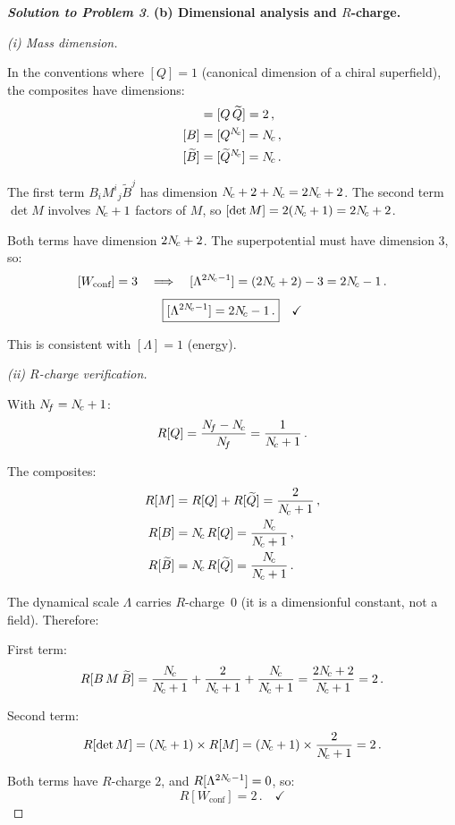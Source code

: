 \documentclass[11pt,a4paper]{article}
\begin{document}
\begin{proof}[\textbf{Solution to Problem 3}]
\bigskip

\textbf{(b) Dimensional analysis and $R$-charge.}

\textit{(i) Mass dimension.}

In the conventions where $[Q] = 1$ (canonical dimension of a chiral
superfield), the composites have dimensions:
\begin{align*}
  [M^i{}_j] &= [Q\,\widetilde{Q}] = 2\,, \\
  [B] &= [Q^{\Nc}] = \Nc\,, \\
  [\widetilde{B}] &= [\widetilde{Q}^{\Nc}] = \Nc\,.
\end{align*}

The first term $B_i M^i{}_j \widetilde{B}^j$ has dimension
$N_{\!c} + 2 + N_{\!c} = 2N_{\!c} + 2$.  The second term $\det M$ involves
$N_{\!c} + 1$ factors of $M$, so $[\det M] = 2(N_{\!c} + 1) = 2N_{\!c} + 2$.

Both terms have dimension $2N_{\!c} + 2$.  The superpotential must have
dimension $3$, so:
\[
  [W_{\text{conf}}] = 3
  \quad\Longrightarrow\quad
  [\Lambda^{2N_{\!c} - 1}] = (2N_{\!c} + 2) - 3 = 2N_{\!c} - 1\,.
\]
\[
  \boxed{[\Lambda^{2N_{\!c} - 1}] = 2N_{\!c} - 1\,.}
  \quad\checkmark
\]

This is consistent with $[\Lambda] = 1$ (energy).

\textit{(ii) $R$-charge verification.}

With $N_{\!f} = N_{\!c} + 1$:
\[
  R[Q] = \frac{N_{\!f} - N_{\!c}}{N_{\!f}} = \frac{1}{N_{\!c} + 1}\,.
\]

The composites:
\begin{align*}
  R[M] &= R[Q] + R[\widetilde{Q}] = \frac{2}{N_{\!c} + 1}\,, \\
  R[B] &= N_{\!c}\,R[Q] = \frac{N_{\!c}}{N_{\!c} + 1}\,, \\
  R[\widetilde{B}] &= N_{\!c}\,R[\widetilde{Q}] = \frac{N_{\!c}}{N_{\!c} + 1}\,.
\end{align*}

The dynamical scale $\Lambda$ carries $R$-charge~$0$ (it is a
dimensionful constant, not a field).  Therefore:

First term:
\[
  R[B\,M\,\widetilde{B}]
  = \frac{N_{\!c}}{N_{\!c}+1} + \frac{2}{N_{\!c}+1} + \frac{N_{\!c}}{N_{\!c}+1}
  = \frac{2N_{\!c} + 2}{N_{\!c} + 1} = 2\,.
\]

Second term:
\[
  R[\det M] = (N_{\!c} + 1) \times R[M]
  = (N_{\!c} + 1) \times \frac{2}{N_{\!c} + 1} = 2\,.
\]

Both terms have $R$-charge $2$, and $R[\Lambda^{2N_{\!c}-1}] = 0$, so:
\[
  R[W_{\text{conf}}] = 2\,.
  \quad\checkmark
\]

\bigskip


\end{proof}
\end{document}
